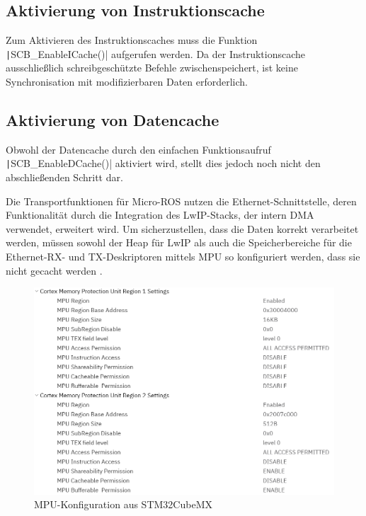 \subsection{Aktivierung von Instruktionscache}

Zum Aktivieren des Instruktionscaches muss die Funktion
\texttt|SCB_EnableICache()| aufgerufen werden. Da der Instruktionscache
ausschließlich schreibgeschützte Befehle zwischenspeichert, ist keine
Synchronisation mit modifizierbaren Daten erforderlich.

\subsection{Aktivierung von Datencache}

Obwohl der Datencache durch den einfachen Funktionsaufruf
\texttt|SCB_EnableDCache()| aktiviert wird, stellt dies jedoch noch
nicht den abschließenden Schritt dar.

Die Transportfunktionen für Micro-ROS nutzen die Ethernet-Schnittstelle, deren
Funktionalität durch die Integration des LwIP-Stacks, der intern DMA verwendet,
erweitert wird. Um sicherzustellen, dass die Daten korrekt verarbeitet werden,
müssen sowohl der Heap für LwIP als auch die Speicherbereiche für die
Ethernet-RX- und TX-Deskriptoren mittels \ac{MPU} so konfiguriert werden, dass
sie nicht gecacht werden \cite{STM32H7_LwIP_Examples}.

\begin{figure}[htb]
    \centering
    \includegraphics[width=1\textwidth]{assets/mpu_conf_cubemx}
    \caption{MPU-Konfiguration aus STM32CubeMX}
\end{figure}

